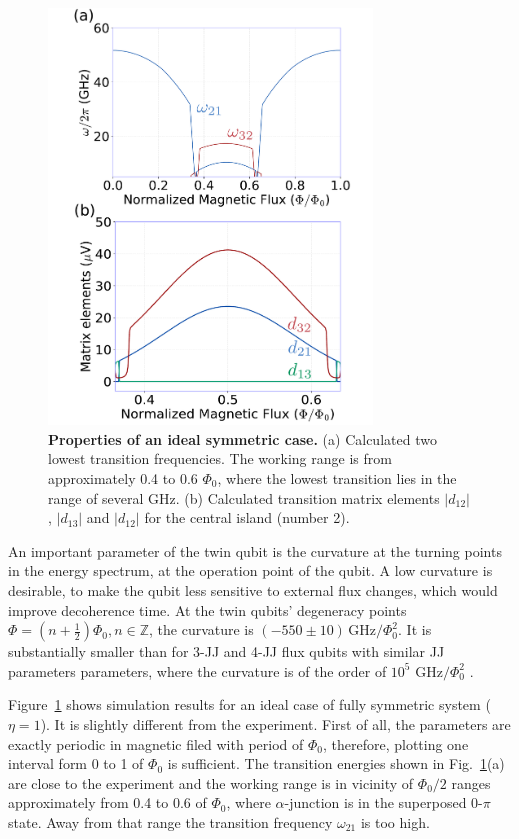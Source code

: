 \documentclass[%
reprint,
superscriptaddress,
bibnotes,
amsmath,
amssymb,
aps,
showkeys,
prb,
]{revtex4-2}
\begin{document}
\begin{figure}
  \includegraphics[width=86mm]{fig3}
  \caption{\small \textbf{Properties of an ideal symmetric case.} 
  (a) Calculated two lowest transition frequencies. The working range is from approximately 0.4 to 0.6 $\Phi_0$, where the lowest transition lies in the range of several GHz. (b) Calculated transition matrix elements $|d_{12}|$, $|d_{13}|$ and $|d_{12}|$ for the central island (number 2). 
  \label{fig:simulations}}
\end{figure}

An  important  parameter of the twin qubit is  the curvature  at the  turning points  in the
energy  spectrum, at  the operation  point  of the  qubit.  A  low curvature  is
desirable, to  make the  qubit less  sensitive to  external flux  changes, which
would  improve  decoherence  time.   At   the  twin  qubits'  degeneracy  points
$      \Phi     =      (n+\frac{1}{2})\Phi_0,     n\in\mathbb{Z}      $,     the      curvature     is
$   (-550\pm10)\,\text{GHz}/\Phi_0^2  $.    It is substantially smaller than for 3-JJ and 4-JJ flux qubits with 
similar JJ parameters parameters, where the curvature is of the order of 
$ 10^5$ $  \text{GHz}/\Phi_0^2$ \cite{Astafiev_2010, Stern_2014, Gustavsson_2012}. 

Figure~\ref{fig:simulations} shows simulation results for an ideal case of fully symmetric system ($\eta=1$). 
It is slightly different from the experiment. First of all, the parameters are exactly periodic in magnetic filed with period of $\Phi_0$, therefore, 
plotting one interval form 0 to 1 of $\Phi_0$ is sufficient. The transition energies shown in Fig.~\ref{fig:simulations}(a) are close to the experiment and the working range is in vicinity of $\Phi_0/2$ ranges approximately from 0.4 to 0.6 of $\Phi_0$, where $\alpha$-junction is in the superposed 0-$\pi$ state\cite{Shulga_2018}. Away from that range the transition frequency $\omega_{21}$ is too high.
\end{document}
